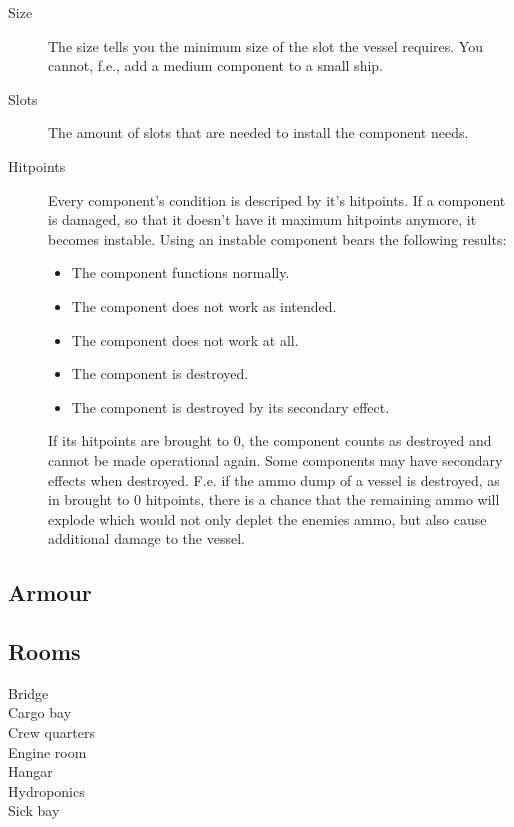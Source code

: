 \begin{description}
  \item[Size] The size tells you the minimum size of the slot the vessel requires. You cannot, f.e., add a medium component to a small ship.
  \item[Slots] The amount of slots that are needed to install the component needs.
  \item[Hitpoints] Every component's condition is descriped by it's hitpoints. If a component is damaged, so that it doesn't have it maximum hitpoints anymore, it becomes instable. Using an instable component bears the following results:
  \begin{itemize}
    \item The component functions normally.
    \item The component does not work as intended.
    \item The component does not work at all.
    \item The component is destroyed.
    \item The component is destroyed by its secondary effect.
  \end{itemize}
   If its hitpoints are brought to 0, the component counts as destroyed and cannot be made operational again. Some components may have secondary effects when destroyed. F.e. if the ammo dump of a vessel is destroyed, as in brought to 0 hitpoints, there is a chance that the remaining ammo will explode which would not only deplet the enemies ammo, but also cause additional damage to the vessel.
\end{description}

\subsection{Armour}
\label{sub:Vessel-Armour}

\subsection{Rooms}
\label{sub:Vessel-Rooms}

\begin{description}
  \item[Bridge]
  \item[Cargo bay]
  \item[Crew quarters]
  \item[Engine room]
  \item[Hangar]
  \item[Hydroponics]
  \item[Sick bay]
\end{description}

